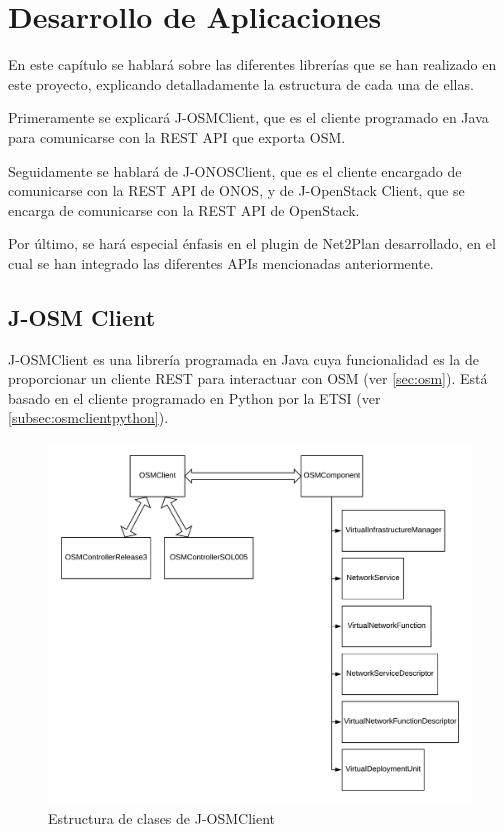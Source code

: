 \chapter{Desarrollo de Aplicaciones}

En este capítulo se hablará sobre las diferentes librerías que se han realizado en este proyecto, explicando detalladamente la estructura de cada una de ellas.

Primeramente se explicará J-OSMClient, que es el cliente programado en Java para comunicarse con la REST API que exporta OSM.

Seguidamente se hablará de J-ONOSClient, que es el cliente encargado de comunicarse con la REST API de ONOS, y de J-OpenStack Client, que se encarga de comunicarse con la REST API de OpenStack.

Por último, se hará especial énfasis en el plugin de Net2Plan desarrollado, en el cual se han integrado las diferentes APIs mencionadas anteriormente.


\section{J-OSM Client}
\label{sec:osmclient}

J-OSMClient es una librería programada en Java cuya funcionalidad es la de proporcionar un cliente REST para interactuar con OSM (ver \ref{sec:osm}). Está basado en el cliente programado en Python por la ETSI (ver \ref{subsec:osmclientpython}).

\begin{figure}[!ht]
	\centering
	\includegraphics[width=0.8\linewidth]{imagenes/OSMClient}
	\caption{Estructura de clases de J-OSMClient}
	\label{fig:osmclient}
\end{figure}

